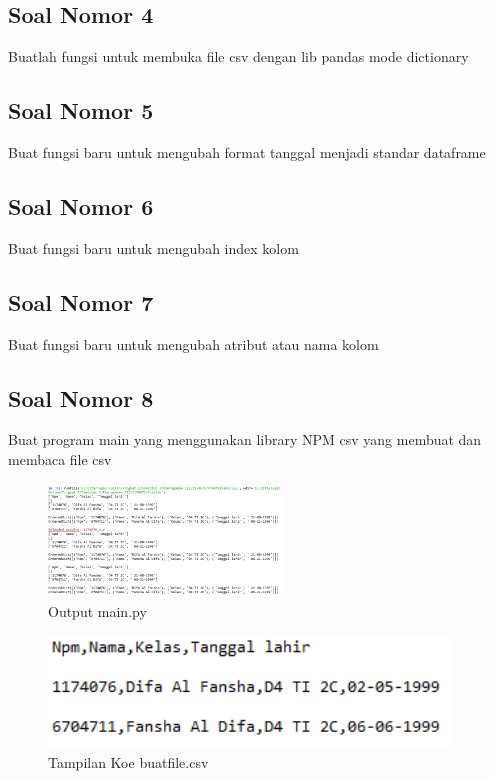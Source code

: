 \subsection{Soal Nomor 4}
Buatlah fungsi untuk membuka file csv dengan lib pandas mode dictionary


\subsection{Soal Nomor 5}
Buat fungsi baru untuk mengubah format tanggal menjadi standar dataframe


\subsection{Soal Nomor 6}
Buat fungsi baru untuk mengubah index kolom


\subsection{Soal Nomor 7}
Buat fungsi baru untuk mengubah atribut atau nama kolom


\subsection{Soal Nomor 8}
Buat program main yang menggunakan library NPM csv yang membuat dan membaca file csv

\begin{figure}[!htbp]
  \centering
  \includegraphics[height=3cm]{figures/4/1174076/Praktek/main.png}
  \caption{Output main.py}
\end{figure}




\begin{figure}[!htbp]
  \centering
  \includegraphics[height=3cm]{figures/4/1174076/Praktek/buatfile.png}
  \caption{Tampilan Koe buatfile.csv}
\end{figure}


